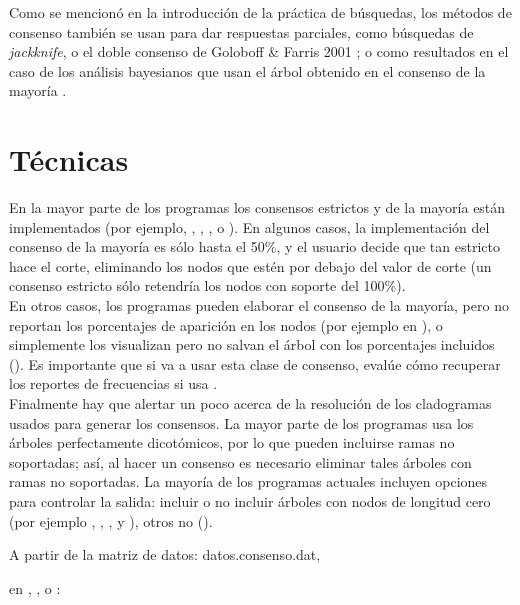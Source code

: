 Como se mencion\'o en la introducci\'on de la pr\'actica de b\'usquedas, los m\'etodos de consenso tambi\'en se  usan para dar respuestas parciales, como b\'usquedas de \textit{jackknife}, o el doble consenso de Goloboff \& Farris 2001 \cite{Goloboff2001}; o como resultados en el caso de los an\'alisis bayesianos que usan el \'arbol obtenido en el consenso de la mayor\'ia \cite{Huelsenbeck2001} \cite{Huelsenbeck2002}.





\section*{T\'ecnicas}
En la mayor parte de los programas los consensos estrictos y de la mayor\'ia est\'an implementados (por ejemplo, , , ,  o ). En algunos casos, la implementaci\'on del consenso de la mayor\'ia es s\'olo hasta el 50\%, y el usuario decide que tan estricto hace el corte, eliminando los nodos que est\'en por debajo del valor de corte (un consenso estricto s\'olo retendr\'ia los nodos con soporte del 100\%).\\
En otros casos, los programas pueden elaborar el consenso de la mayor\'ia, pero no reportan los porcentajes de aparici\'on en los nodos (por ejemplo en ), o simplemente los visualizan pero no salvan el \'arbol con los porcentajes incluidos (). Es importante que si va a usar esta clase de consenso, eval\'ue c\'omo recuperar los reportes de frecuencias si usa .\\
Finalmente hay que alertar un poco acerca de la resoluci\'on de los cladogramas usados para generar los consensos. La mayor parte de los programas usa los \'arboles perfectamente dicot\'omicos, por lo que pueden incluirse ramas no soportadas; as\'i, al hacer un consenso es necesario eliminar tales \'arboles con ramas no soportadas. La mayor\'ia de los programas actuales incluyen opciones para controlar la salida: incluir o no incluir \'arboles con nodos de longitud cero (por ejemplo , , ,  y ), otros no ().


\noindent

A partir de la matriz de datos: datos.consenso.dat, 

en , ,  o :

